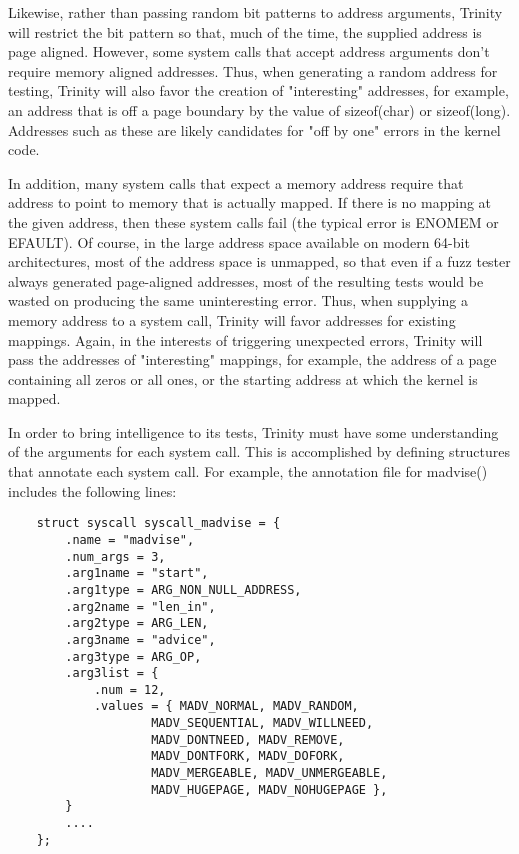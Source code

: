\documentclass[twoside]{article}
\begin{document}
\begin{multicols}{2}
Likewise, rather than passing random bit patterns to address arguments, Trinity will restrict the bit pattern so that, much of the time, the supplied address is page aligned. However, some system calls that accept address arguments don't require memory aligned addresses. Thus, when generating a random address for testing, Trinity will also favor the creation of "interesting" addresses, for example, an address that is off a page boundary by the value of sizeof(char) or sizeof(long). Addresses such as these are likely candidates for "off by one" errors in the kernel code.

In addition, many system calls that expect a memory address require that address to point to memory that is actually mapped. If there is no mapping at the given address, then these system calls fail (the typical error is ENOMEM or EFAULT). Of course, in the large address space available on modern 64-bit architectures, most of the address space is unmapped, so that even if a fuzz tester always generated page-aligned addresses, most of the resulting tests would be wasted on producing the same uninteresting error. Thus, when supplying a memory address to a system call, Trinity will favor addresses for existing mappings. Again, in the interests of triggering unexpected errors, Trinity will pass the addresses of "interesting" mappings, for example, the address of a page containing all zeros or all ones, or the starting address at which the kernel is mapped.

In order to bring intelligence to its tests, Trinity must have some understanding of the arguments for each system call. This is accomplished by defining structures that annotate each system call. For example, the annotation file for madvise() includes the following lines:

{\footnotesize
\begin{lstlisting}
    struct syscall syscall_madvise = {
        .name = "madvise",
        .num_args = 3,
        .arg1name = "start",
        .arg1type = ARG_NON_NULL_ADDRESS,
        .arg2name = "len_in",
        .arg2type = ARG_LEN,
        .arg3name = "advice",
        .arg3type = ARG_OP,
        .arg3list = {
            .num = 12,
            .values = { MADV_NORMAL, MADV_RANDOM, 
                    MADV_SEQUENTIAL, MADV_WILLNEED,
                    MADV_DONTNEED, MADV_REMOVE,
                    MADV_DONTFORK, MADV_DOFORK,
                    MADV_MERGEABLE, MADV_UNMERGEABLE, 
                    MADV_HUGEPAGE, MADV_NOHUGEPAGE },
        }
        ....
    }; 
    

\end{lstlisting}}
\end{multicols}
\end{document}
